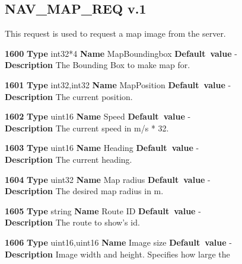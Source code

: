 \documentclass[a4paper]{article}
\begin{document}
\subsection{NAV\_MAP\_REQ v.1}

This request is used to request a map image from the server.

\begin{list}{\textbf{ParamID}}{}
\item \textbf{1600} \textbf{Type} int32*4 \textbf{Name} MapBoundingbox
                 \textbf{Default~value} - \\
  \label{MapBoundingbox}
  \textbf{Description} The Bounding Box to make map for.
\item \textbf{1601} \textbf{Type} int32,int32 \textbf{Name} MapPosition
                 \textbf{Default~value} - \\
  \label{MapPosition}
  \textbf{Description} The current position.
\item \textbf{1602} \textbf{Type} uint16 \textbf{Name} Speed
                 \textbf{Default~value} - \\
  \label{Speed}
  \textbf{Description} The current speed in m/s * 32.
\item \textbf{1603} \textbf{Type} uint16 \textbf{Name} Heading
                 \textbf{Default~value} - \\
  \label{Heading}
  \textbf{Description} The current heading.
\item \textbf{1604} \textbf{Type} uint32 \textbf{Name} Map radius
                 \textbf{Default~value} - \\
  \label{Map radius}
  \textbf{Description} The desired map radius in m.
\item \textbf{1605} \textbf{Type} string \textbf{Name} Route ID
                 \textbf{Default~value} - \\
  \label{Route ID}
  \textbf{Description} The route to show's id.
\item \textbf{1606} \textbf{Type} uint16,uint16 \textbf{Name} Image size
                 \textbf{Default~value} - \\
  \label{Image size}
  \textbf{Description} Image width and height. Specifies how large the

\end{list}
\end{document}
